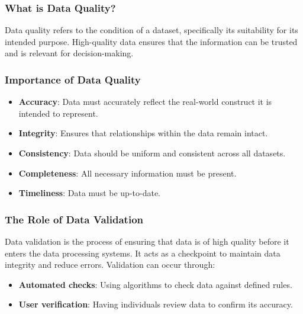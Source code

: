 \documentclass[aspectratio=169]{beamer}
\begin{document}
\frame{\titlepage}

\begin{frame}[fragile]
    \maketitle
\end{frame}

\begin{frame}[fragile]
    \frametitle{What is Data Quality?}
    Data quality refers to the condition of a dataset, specifically its suitability for its intended purpose. High-quality data ensures that the information can be trusted and is relevant for decision-making.
\end{frame}

\begin{frame}[fragile]
    \frametitle{Importance of Data Quality}
    \begin{itemize}
        \item \textbf{Accuracy}: Data must accurately reflect the real-world construct it is intended to represent.
        \item \textbf{Integrity}: Ensures that relationships within the data remain intact.
        \item \textbf{Consistency}: Data should be uniform and consistent across all datasets.
        \item \textbf{Completeness}: All necessary information must be present.
        \item \textbf{Timeliness}: Data must be up-to-date.
    \end{itemize}
\end{frame}

\begin{frame}[fragile]
    \frametitle{The Role of Data Validation}
    Data validation is the process of ensuring that data is of high quality before it enters the data processing systems. It acts as a checkpoint to maintain data integrity and reduce errors. Validation can occur through:
    \begin{itemize}
        \item \textbf{Automated checks}: Using algorithms to check data against defined rules.
        \item \textbf{User verification}: Having individuals review data to confirm its accuracy.
    \end{itemize}
\end{frame}
\end{document}
